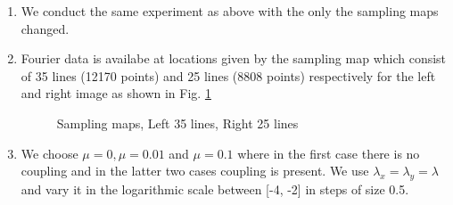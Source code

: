 \begin{enumerate}
\item We conduct the same experiment as above with the only the sampling maps changed.
\item Fourier data is availabe at locations given by the sampling map which consist of 35 lines (12170 points) and 25 lines (8808 points) respectively for the left and right image as shown in Fig. \ref{fig:expt37}
\begin{figure}[b!]

\hspace{-0.5in}
		\hspace{-1in}
\caption [Sampling maps, Left 35 lines, Right 25 lines]{Sampling maps, Left 35 lines, Right 25 lines}
\label{fig:expt37}
\end{figure}
\item We choose $\mu = 0, \mu = 0.01$ and $\mu = 0.1$ where in the first case there is no coupling and in the latter two cases coupling is present. We use $\lambda_x = \lambda_y = \lambda$ and vary it in the logarithmic scale between [-4, -2] in steps of size 0.5. 


\end{enumerate}
